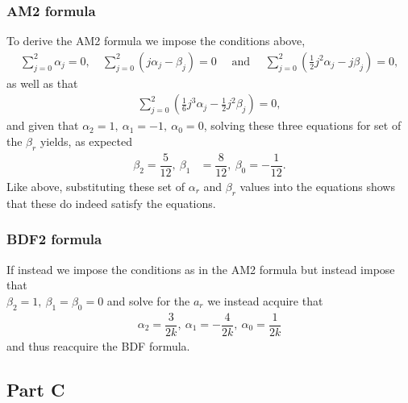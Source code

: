 \documentclass[12pt]{article}
\begin{document}
\subsubsection*{AM2 formula}
To derive the AM2 formula we impose the conditions above,
\begin{align}
	\sum_{j=0}^{2} \alpha_{j}=0, \quad \sum_{j=0}^{2} \left(j \alpha_{j}-\beta_{j}\right)=0 \quad \text { and }\quad \sum_{j=0}^{2}\left(\frac{1}{2} j^{2} \alpha_{j}-j \beta_{j}\right) = 0,
\end{align}
as well as that 
\begin{align}
	\sum_{j=0}^{2}\left(\frac{1}{6} j^{3} \alpha_{j}-\frac{1}{2} j^{2} \beta_{j}\right) = 0,
\end{align}
and given that $\alpha_{2} = 1,\ \alpha_{1} = -1,\ \alpha_{0} = 0$, solving these three equations for set of the $\beta_{r}$ yields, as expected
\begin{align}
	\beta_{2} = \dfrac{5}{12},\ \beta_{1} &= \dfrac{8}{12},\ \beta_{0} = -\dfrac{1}{12}.
\end{align}
Like above, substituting these set of $\alpha_{r}$ and $\beta_{r}$ values into the equations shows that these do indeed satisfy the equations. 

\subsubsection*{BDF2 formula}
If instead we impose the conditions as in the AM2 formula but instead impose that \\ $\beta_{2} = 1,\ \beta_{1} = \beta_{0}= 0$ and solve for the $a_{r}$ we instead acquire that 
\begin{align}
	\alpha_{2}=\dfrac{3}{2k},\ \alpha_{1} = -\dfrac{4}{2k},\ \alpha_{0} = \dfrac{1}{2k}
\end{align}
and thus reacquire the BDF formula.


\subsection*{Part C}
\end{document}
